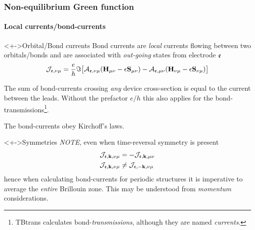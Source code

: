 \begin{frame}
  \frametitle{Non-equilibrium Green function}
  \framesubtitle{Local currents/bond-currents}

  \begin{block}<+->{Orbital/Bond currents}
    Bond currents are \emph{local} currents flowing between two orbitals/bonds and are
    associated with \emph{out-going} states from electrode $\mathfrak{e}$
    \begin{equation*}
      \mathcal{J}_{\mathfrak{e},\nu\mu} = \frac e h \Im\big[
      \mathcal{A}_{\mathfrak{e},\nu\mu}(\mathbf{H}_{\mu\nu} - \epsilon\mathbf{S}_{\mu\nu})
      -
      \mathcal{A}_{\mathfrak{e},\mu\nu}(\mathbf{H}_{\nu\mu} - \epsilon\mathbf{S}_{\nu\mu})\big]
    \end{equation*}

    The sum of bond-currents crossing \emph{any} device cross-section is equal to the
    current between the leads. Without the prefactor $e/h$ this also applies for the
    bond-transmissions\footnote{TBtrans calculates bond-\emph{transmissions}, although
        they are named \emph{currents}.}.

    The bond-currents obey Kirchoff's laws.
    
  \end{block}
  
  \begin{block}<+->{Symmetries}
    \emph{NOTE}, even when time-reversal symmetry is present
    \begin{align*}
      \mathcal{J}_{\mathfrak{e},\mathbf{k},\nu\mu} &= - \mathcal{J}_{\mathfrak{e},\mathbf{k},\mu\nu}
      \\
      \mathcal{J}_{\mathfrak{e},\mathbf{k},\nu\mu} &\neq \mathcal{J}_{\mathfrak{e},-\mathbf{k},\nu\mu}
    \end{align*}
    hence when calculating bond-currents for periodic structures it is imperative to
    average the \emph{entire} Brillouin zone. This may be understood from \emph{momentum}
    considerations. 
  \end{block}
  
\end{frame}


